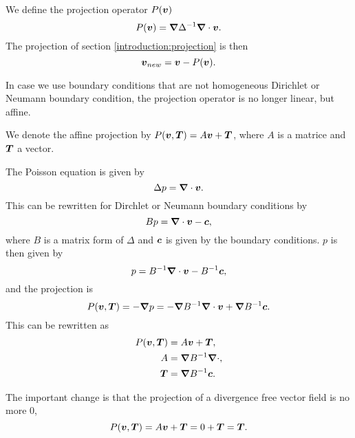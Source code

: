 \begin{definition}
\label{introduction:projectiondef}
We define the projection operator $P({\boldsymbol {v}})$
  \begin{equation}
    P({\boldsymbol {v}})={\boldsymbol {\nabla}}\Delta^{-1}{\boldsymbol {\nabla}}\cdot {\boldsymbol {v}}.
  \end{equation}
  The projection of section \ref{introduction:projection} is then
  \begin{equation}
    {\boldsymbol {v}}_{new}={\boldsymbol {v}}-P({\boldsymbol {v}}).
  \end{equation}
\end{definition}
  In case we use boundary conditions that are not homogeneous Dirichlet or Neumann boundary condition,
  the projection operator is no longer linear, but affine.

  \begin{definition}
  We denote the affine projection by $P({\boldsymbol {v}},{\boldsymbol {T}})=A{\boldsymbol {v}}+{\boldsymbol {T}}$, where $A$ is a matrice and ${\boldsymbol {T}}$ a vector.
  
  The Poisson equation is given by
  \begin{equation}
   \Delta p={\boldsymbol {\nabla}} \cdot {\boldsymbol {v}}.
  \end{equation}
This can be rewritten for Dirchlet or Neumann boundary conditions by
\begin{equation}
 B p={\boldsymbol {\nabla}} \cdot {\boldsymbol {v}}-{\boldsymbol {c}},
\end{equation}
where $B$ is a matrix form of $\Delta$ and ${\boldsymbol {c}}$ is given by the boundary conditions.
$p$ is then given by
\begin{equation}
 p=B^{-1} {\boldsymbol {\nabla}} \cdot {\boldsymbol {v}}-B^{-1}{\boldsymbol {c}},
\end{equation}
and the projection is
\begin{equation}
 P({\boldsymbol {v}},{\boldsymbol {T}})=-{\boldsymbol {\nabla}} p=-{\boldsymbol {\nabla}} B^{-1}{\boldsymbol {\nabla}} \cdot {\boldsymbol {v}}+{\boldsymbol {\nabla}} B^{-1}{\boldsymbol {c}}.
\end{equation}
This can be rewritten as
\begin{align}
P({\boldsymbol {v}},{\boldsymbol {T}})&=A{\boldsymbol {v}}+{\boldsymbol {T}},\\
A&={\boldsymbol {\nabla}} B^{-1}{\boldsymbol {\nabla}} \cdot,\\
{\boldsymbol {T}}&={\boldsymbol {\nabla}} B^{-1}{\boldsymbol {c}}.
\end{align}
  
  \end{definition}
  
  The important change is that the projection of a divergence free vector field is no more 0,
  \begin{equation}
  P({\boldsymbol {v}},{\boldsymbol {T}})=A{\boldsymbol {v}}+{\boldsymbol {T}}=0+{\boldsymbol {T}}={\boldsymbol {T}}.
  \end{equation}



